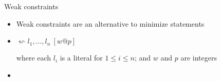 \begin{frame}[fragile]{Weak constraints}
  \medskip
  \begin{itemize}
  \item<1-> Weak constraints are an alternative to minimize statements
    \smallskip
  \item<2->  \quad $\leftsquigarrow  l_1,\dots, l_n\ [w@p]$

    \smallskip
    where each $l_i$ is a literal for $1\leq i\leq n$;
    and $w$ and $p$ are integers
    \medskip
  \item<3-> 
\begin{semiverbatim}
\end{semiverbatim}
  \end{itemize}
\end{frame}
%
